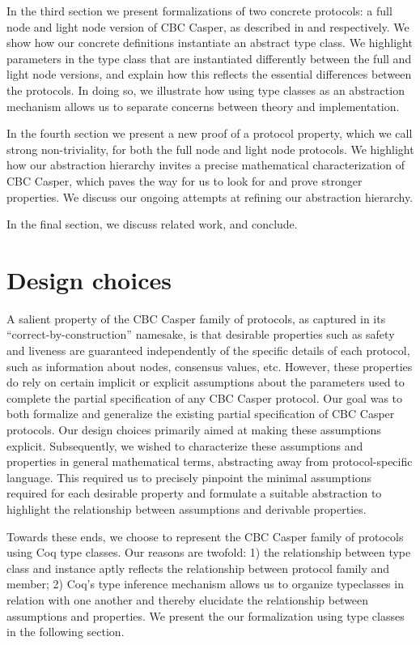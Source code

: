 \documentclass[runningheads]{llncs}
\begin{document}
In the third section we present formalizations of two concrete protocols: a full node and light node version of CBC Casper, as described in \cite{CBCfull} and \cite{CBClight} respectively. We show how our concrete definitions instantiate an abstract type class. We highlight parameters in the type class that are instantiated differently between the full and light node versions, and explain how this reflects the essential differences between the protocols. In doing so, we illustrate how using type classes as an abstraction mechanism allows us to separate concerns between theory and implementation. 

In the fourth section we present a new proof of a protocol property, which we call strong non-triviality, for both the full node and light node protocols. We highlight how our abstraction hierarchy invites a precise mathematical characterization of CBC Casper, which paves the way for us to look for and prove stronger properties. We discuss our ongoing attempts at refining our abstraction hierarchy. 

In the final section, we discuss related work, and conclude. 


\section{Design choices} 
A salient property of the CBC Casper family of protocols, as captured in its ``correct-by-construction'' namesake, is that desirable properties such as safety and liveness are guaranteed independently of the specific details of each protocol, such as information about nodes, consensus values, etc. However, these properties do rely on certain implicit or explicit assumptions about the parameters used to complete the partial specification of any CBC Casper protocol. Our goal was to both formalize and generalize the existing partial specification of CBC Casper protocols. Our design choices primarily aimed at making these assumptions explicit. Subsequently, we wished to characterize these assumptions and properties in general mathematical terms, abstracting away from protocol-specific language. This required us to precisely pinpoint the minimal assumptions required for each desirable property and formulate a suitable abstraction to highlight the relationship between assumptions and derivable properties. 

Towards these ends, we choose to represent the CBC Casper family of protocols using Coq type classes. Our reasons are twofold: 1) the relationship between type class and instance aptly reflects the relationship between protocol family and member; 2) Coq's type inference mechanism allows us to organize typeclasses in relation with one another and thereby elucidate the relationship between assumptions and properties. We present the our formalization using type classes in the following section. 
\end{document}
